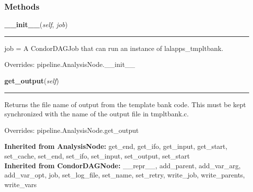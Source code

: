   \subsubsection{Methods}

    \label{inspiral:TmpltBankNode:__init__}
    \vspace{0.5ex}

    \noindent\begin{boxedminipage}{\textwidth}

    \raggedright \textbf{\_\_init\_\_}(\textit{self}, \textit{job})

    \vspace{-1.5ex}

    \rule{\textwidth}{0.5\fboxrule}
    job = A CondorDAGJob that can run an instance of lalapps\_tmpltbank.

    \vspace{1ex}

      Overrides: pipeline.AnalysisNode.\_\_init\_\_

    \end{boxedminipage}

    \label{inspiral:TmpltBankNode:get_output}
    \vspace{0.5ex}

    \noindent\begin{boxedminipage}{\textwidth}

    \raggedright \textbf{get\_output}(\textit{self})

    \vspace{-1.5ex}

    \rule{\textwidth}{0.5\fboxrule}
    Returns the file name of output from the template bank code. This 
    must be kept synchronized with the name of the output file in 
    tmpltbank.c.

    \vspace{1ex}

      Overrides: pipeline.AnalysisNode.get\_output

    \end{boxedminipage}

  \noindent\textbf{Inherited from AnalysisNode:}
    get\_end,
    get\_ifo,
    get\_input,
    get\_start,
    set\_cache,
    set\_end,
    set\_ifo,
    set\_input,
    set\_output,
    set\_start
    \\
  \noindent\textbf{Inherited from CondorDAGNode:}
    \_\_repr\_\_,
    add\_parent,
    add\_var\_arg,
    add\_var\_opt,
    job,
    set\_log\_file,
    set\_name,
    set\_retry,
    write\_job,
    write\_parents,
    write\_vars

